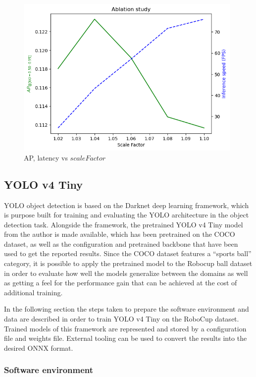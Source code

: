 \documentclass[a4paper,twoside,12pt]{report}
\begin{document}
\begin{figure}[h!]
\begin{center}
\includegraphics[width=11cm]{images/vj_ablation.png}
\caption{AP, latency vs $scaleFactor$}
\label{fig:vjspeeds}
\end{center}
\end{figure}

\subsection{YOLO v4 Tiny}

YOLO object detection is based on the Darknet deep learning framework, which is purpose built for training and evaluating the YOLO architecture in the object detection task. Alongside the framework, the pretrained YOLO v4 Tiny \citep{yolov4tiny} model from the author is made available, which has been pretrained on the COCO dataset, as well as the configuration and pretrained backbone that have been used to get the reported results. Since the COCO dataset features a ``sports ball'' category, it is possible to apply the pretrained model to the Robocup ball dataset in order to evaluate how well the models generalize between the domains as well as getting a feel for the performance gain that can be achieved at the cost of additional training.

In the following section the steps taken to prepare the software environment and data are described in order to train YOLO v4 Tiny on the RoboCup dataset. Trained models of this framework are represented and stored by a configuration file and weights file. External tooling can be used to convert the results into the desired ONNX format. 

\subsubsection{Software environment}
\end{document}
